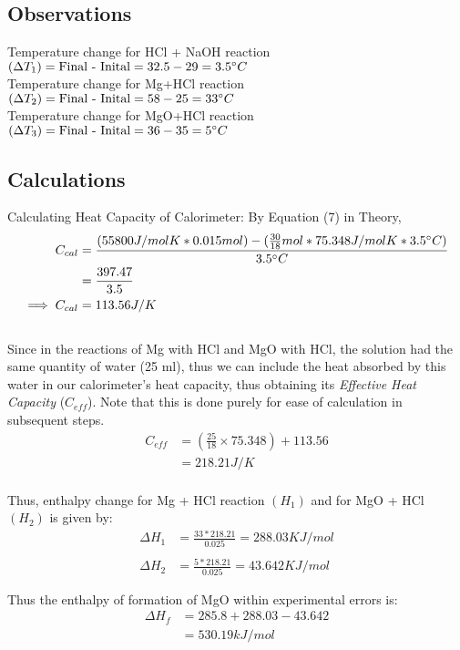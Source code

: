 \cleardoublepage
\subsection{Observations}
Temperature change for HCl + NaOH reaction $(\Delta T_1) = \text{Final - Inital} = 32.5 - 29 = 3.5\degree C$ \\
Temperature change for Mg+HCl reaction $(\Delta T_2) = \text{Final - Inital} = 58 - 25 = 33\degree C$ \\
Temperature change for MgO+HCl reaction $(\Delta T_3) = \text{Final - Inital} = 36 - 35 = 5\degree C$ \\

\subsection{Calculations}
Calculating Heat Capacity of Calorimeter:
By Equation (7) in Theory,
\begin{align*}
  C_{cal}&=\frac{(55800J/molK * 0.015 mol) - (\frac{30}{18} mol * 75.348J/mol K * 3.5\degree C)}{3.5\degree C} \\
  &= \frac{397.47}{3.5} \\
    \implies C_{cal}&=113.56 J/K
\end{align*}
\\
Since in the reactions of Mg with HCl and MgO with HCl, the solution had the same quantity of water (25 ml), thus we can include the heat absorbed by this water in our calorimeter's heat capacity, thus obtaining its \emph{Effective Heat Capacity} ($C_{eff}$). Note that this is done purely for ease of calculation in subsequent steps.
\begin{align*}
  C_{eff} &= (\frac{25}{18} \times 75.348) + 113.56 \\
  &=218.21 J/K \\
\end{align*}

Thus, enthalpy change for Mg + HCl reaction $(H_1)$ and for MgO + HCl $(H_2)$ is given by:
\begin{align*}
  \Delta H_1 &= \frac{33*218.21}{0.025} = 288.03 KJ/mol \\ \\
  \Delta H_2 &= \frac{5*218.21}{0.025} = 43.642 KJ/mol
\end{align*}

Thus the enthalpy of formation of MgO within experimental errors is:
\begin{align*}
  \Delta H_f &= 285.8 + 288.03 - 43.642 \\
&= 530.19 kJ/mol
\end{align*}

